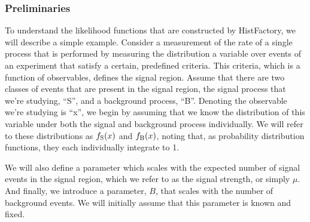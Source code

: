 \subsubsection{Preliminaries}

To understand the likelihood functions that are constructed by HistFactory, we will describe a simple example.
Consider a measurement of the rate of a single process that is performed by measuring the distribution a variable over events of an experiment that satisfy a certain, predefined criteria.
This criteria, which is a function of observables, defines the signal region.
Assume that there are two classes of events that are present in the signal region, the signal process that we're studying, ``S'', and a background process, ``B''.
Denoting the observable we're studying is ``x'', we begin by assuming that we know the distribution of this variable under both the signal and background process individually.
We will refer to these distributions as $f_{\rm S}(x)$ and $f_{\rm B}(x)$, noting that, as probability distribution functions, they each individually integrate to 1.

We will also define a parameter which scales with the expected number of signal events in the signal region, which we refer to as the signal strength, or simply $\mu$.
And finally, we introduce a parameter, $B$, that scales with the number of background events.
We will initially assume that this parameter is known and fixed.




